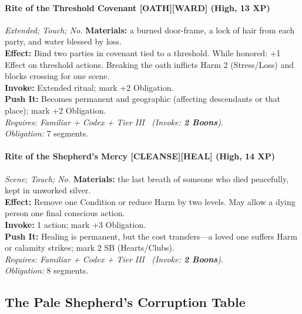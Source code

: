 \paragraph{Rite of the Threshold Covenant \textnormal{[OATH][WARD]} (High, 13 XP)} \emph{Extended; Touch; No.}
\textbf{Materials:} a burned door-frame, a lock of hair from each party, and water blessed by loss.\\
\textbf{Effect:} Bind two parties in covenant tied to a threshold. While honored: +1 Effect on threshold actions. Breaking the oath inflicts Harm 2 (Stress/Loss) and blocks crossing for one scene.\\
\textbf{Invoke:} Extended ritual; mark +2 Obligation.\\
\textbf{Push It:} Becomes permanent and geographic (affecting descendants or that place); mark +2 Obligation.\\
\emph{Requires: Familiar + Codex + Tier III \ (\textit{Invoke:} \textbf{2 Boons}).}\\
\emph{Obligation:} 7 segments.

\paragraph{Rite of the Shepherd's Mercy \textnormal{[CLEANSE][HEAL]} (High, 14 XP)} \emph{Scene; Touch; No.}
\textbf{Materials:} the last breath of someone who died peacefully, kept in unworked silver.\\
\textbf{Effect:} Remove one Condition or reduce Harm by two levels. May allow a dying person one final conscious action.\\
\textbf{Invoke:} 1 action; mark +3 Obligation.\\
\textbf{Push It:} Healing is permanent, but the cost transfers—a loved one suffers Harm or calamity strikes; mark 2 SB (Hearts/Clubs).\\
\emph{Requires: Familiar + Codex + Tier III \ (\textit{Invoke:} \textbf{2 Boons}).}\\
\emph{Obligation:} 8 segments.

\subsection*{The Pale Shepherd's Corruption Table}
\label{sec:pale-shepherd-corruption}

